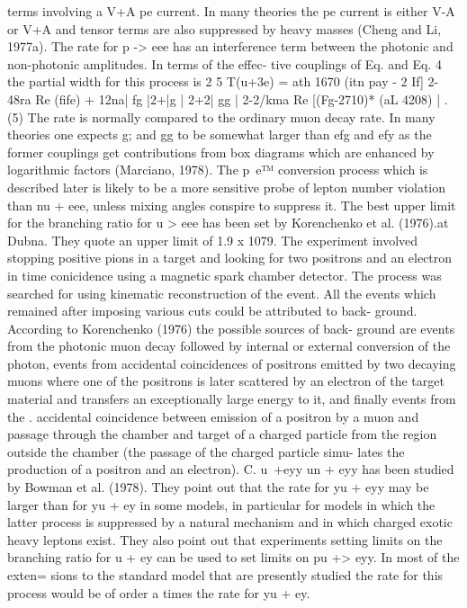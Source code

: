 \documentclass[twoside]{article}
\begin{document}
{{{{{{terms involving a V+A pe current. In many theories the pe current is
either V-A or V+A and tensor terms are also suppressed by heavy masses
(Cheng and Li, 1977a). The rate for p -> eee has an interference term
between the photonic and non-photonic amplitudes. In terms of the effec-
tive couplings of Eq. } and Eq. 4 the partial width for this process is
2 5
T(u+3e) = ath 1670 (itn pay - 2 If] 2-48ra Re (fife) +
12na| fg |2+|g | 2+2| gg | 2-2/kma Re [(Fg-2710)* (aL 4208) | . (5)
The rate is normally compared to the ordinary muon decay rate. In many
theories one expects g; and gg to be somewhat larger than efg and efy
as the former couplings get contributions from box diagrams which are
enhanced by logarithmic factors (Marciano, 1978). The p~e™ conversion
process which is described later is likely to be a more sensitive probe
of lepton number violation than nu + eee, unless mixing angles conspire
to suppress it. The best upper limit for the branching ratio for
u > eee has been set by Korenchenko et al. (1976).at Dubna. They quote
an upper limit of 1.9 x 1079. The experiment involved stopping positive
pions in a target and looking for two positrons and an electron in time
conicidence using a magnetic spark chamber detector. The process was
searched for using kinematic reconstruction of the event. All the events
which remained after imposing various cuts could be attributed to back-
ground. According to Korenchenko (1976) the possible sources of back-
ground are events from the photonic muon decay followed by internal or
external conversion of the photon, events from accidental coincidences
of positrons emitted by two decaying muons where one of the positrons
is later scattered by an electron of the target material and transfers
an exceptionally large energy to it, and finally events from the
. 
accidental coincidence between emission of a positron by a muon and
passage through the chamber and target of a charged particle from the
region outside the chamber (the passage of the charged particle simu-
lates the production of a positron and an electron).
C. u~+eyy
un + eyy has been studied by Bowman et al. (1978). They point out
that the rate for yu + eyy may be larger than for yu + ey in some models,
in particular for models in which the latter process is suppressed by a
natural mechanism and in which charged exotic heavy leptons exist. They
also point out that experiments setting limits on the branching ratio
for u + ey can be used to set limits on pu +> eyy. In most of the exten=
sions to the standard model that are presently studied the rate for this
process would be of order a times the rate for yu + ey.
}}}}}
\end{document}
